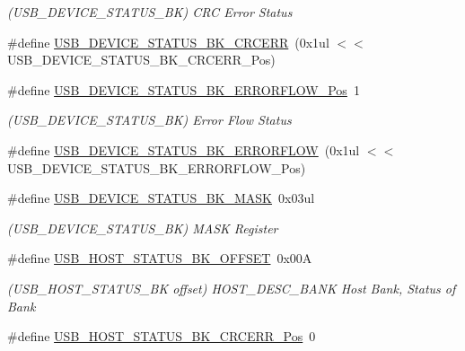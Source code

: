 \begin{DoxyCompactItemize}
\begin{DoxyCompactList}\small\item\em (U\+S\+B\+\_\+\+D\+E\+V\+I\+C\+E\+\_\+\+S\+T\+A\+T\+U\+S\+\_\+\+BK) C\+RC Error Status \end{DoxyCompactList}\item 
\#define \mbox{\hyperlink{group___s_a_m_d21___u_s_b_ga1237eacf35d6528d918dadba5f9b5efa}{U\+S\+B\+\_\+\+D\+E\+V\+I\+C\+E\+\_\+\+S\+T\+A\+T\+U\+S\+\_\+\+B\+K\+\_\+\+C\+R\+C\+E\+RR}}~(0x1ul $<$$<$ U\+S\+B\+\_\+\+D\+E\+V\+I\+C\+E\+\_\+\+S\+T\+A\+T\+U\+S\+\_\+\+B\+K\+\_\+\+C\+R\+C\+E\+R\+R\+\_\+\+Pos)
\item 
\#define \mbox{\hyperlink{group___s_a_m_d21___u_s_b_gac53cf95fda3e0f35814310e07d1a6e71}{U\+S\+B\+\_\+\+D\+E\+V\+I\+C\+E\+\_\+\+S\+T\+A\+T\+U\+S\+\_\+\+B\+K\+\_\+\+E\+R\+R\+O\+R\+F\+L\+O\+W\+\_\+\+Pos}}~1
\begin{DoxyCompactList}\small\item\em (U\+S\+B\+\_\+\+D\+E\+V\+I\+C\+E\+\_\+\+S\+T\+A\+T\+U\+S\+\_\+\+BK) Error Flow Status \end{DoxyCompactList}\item 
\#define \mbox{\hyperlink{group___s_a_m_d21___u_s_b_gac620021896168109190f2454515c0d01}{U\+S\+B\+\_\+\+D\+E\+V\+I\+C\+E\+\_\+\+S\+T\+A\+T\+U\+S\+\_\+\+B\+K\+\_\+\+E\+R\+R\+O\+R\+F\+L\+OW}}~(0x1ul $<$$<$ U\+S\+B\+\_\+\+D\+E\+V\+I\+C\+E\+\_\+\+S\+T\+A\+T\+U\+S\+\_\+\+B\+K\+\_\+\+E\+R\+R\+O\+R\+F\+L\+O\+W\+\_\+\+Pos)
\item 
\#define \mbox{\hyperlink{group___s_a_m_d21___u_s_b_ga579888f0bf6dec18f172a4b8d80b508a}{U\+S\+B\+\_\+\+D\+E\+V\+I\+C\+E\+\_\+\+S\+T\+A\+T\+U\+S\+\_\+\+B\+K\+\_\+\+M\+A\+SK}}~0x03ul
\begin{DoxyCompactList}\small\item\em (U\+S\+B\+\_\+\+D\+E\+V\+I\+C\+E\+\_\+\+S\+T\+A\+T\+U\+S\+\_\+\+BK) M\+A\+SK Register \end{DoxyCompactList}\item 
\#define \mbox{\hyperlink{group___s_a_m_d21___u_s_b_ga1382ea1ebed8e7cd8730f4b4463a1691}{U\+S\+B\+\_\+\+H\+O\+S\+T\+\_\+\+S\+T\+A\+T\+U\+S\+\_\+\+B\+K\+\_\+\+O\+F\+F\+S\+ET}}~0x00A
\begin{DoxyCompactList}\small\item\em (U\+S\+B\+\_\+\+H\+O\+S\+T\+\_\+\+S\+T\+A\+T\+U\+S\+\_\+\+BK offset) H\+O\+S\+T\+\_\+\+D\+E\+S\+C\+\_\+\+B\+A\+NK Host Bank, Status of Bank \end{DoxyCompactList}\item 
\#define \mbox{\hyperlink{group___s_a_m_d21___u_s_b_ga1753ef6c4200f600ff2f99f4e7dd2266}{U\+S\+B\+\_\+\+H\+O\+S\+T\+\_\+\+S\+T\+A\+T\+U\+S\+\_\+\+B\+K\+\_\+\+C\+R\+C\+E\+R\+R\+\_\+\+Pos}}~0

\end{DoxyCompactItemize}
